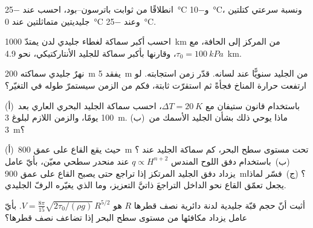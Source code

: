 \begin{exercise}[$\star\star$]\label{exo:b3:glaciology:6}
انطلاقًا من ثوابت باترسون--بود، احسب  عند
\qty{-25}{\celsius} و\qty{-10}{\celsius}، ونسبة سرعتي
كتلتين جليديتين متماثلتين عند \qty{0}{\celsius} وعند \qty{-25}{\celsius}.
\end{exercise}

\begin{exercise}[$\star\star$]\label{exo:b3:glaciology:7}
احسب أكبر سماكة لغطاء جليدي لدن يمتدّ \qty{1000}{km} من
المركز إلى الحافة، مع $\tau_0 = \qty{100}{kPa}$، وقارنها بأكبر
سماكة للجليد الأنتاركتيكي، نحو \qty{4.9}{km}.
\end{exercise}

\begin{exercise}[$\star\star$]\label{exo:b3:glaciology:8}
نهرٌ جليدي سماكته \qty{200}{m} يفقد \qty{5}{m} من الجليد سنويًّا عند لسانه.
قدّر زمن استجابته. لو ارتفعت حرارة المناخ فجأةً ثم استقرّت
ثابتة، فكم من الزمن سيستمرّ طوله في التغيّر؟
\end{exercise}

\begin{exercise}[$\star\star$]\label{exo:b3:glaciology:9}
(أ)~باستخدام قانون ستيفان مع $\Delta T = \qty{20}{K}$، احسب سماكة
الجليد البحري العاري بعد 100 يومًا، والزمن اللازم لبلوغ \qty{3}{m}.
(ب)~ماذا يوحي ذلك بشأن الجليد الأسمك من \qty{3}{m}؟
\end{exercise}

\begin{exercise}[$\star\star\star$]\label{exo:b3:glaciology:10}
(أ)~حيث يقع القاع على عمق \qty{800}{m} تحت مستوى سطح البحر، كم سماكة الجليد عند
؟ (ب)~باستخدام دفق اللوح المندس $q \propto H^{n+2}$ عند منحدر سطحي معيّن،
بأيّ عامل يزداد دفق الجليد المرتكز إذا تراجع
 حتى يصبح القاع على عمق \qty{900}{m}؟ (ج)~فسّر
لماذا يجعل تعمّق القاع نحو الداخل التراجعَ ذاتيَّ التعزيز، وما الذي
يغيّره الرفّ الجليدي.
\end{exercise}

\begin{exercise}[$\star\star\star$]\label{exo:b3:glaciology:11}
أثبت أنّ حجم قبّة جليدية لدنة دائرية نصف قطرها $R$ هو $V =
\frac{8\pi}{15}\sqrt{2\tau_0/(\rho g)}\,R^{5/2}$. بأيّ عامل يزداد
مكافئها من مستوى سطح البحر إذا تضاعف نصف قطرها؟
\end{exercise}

